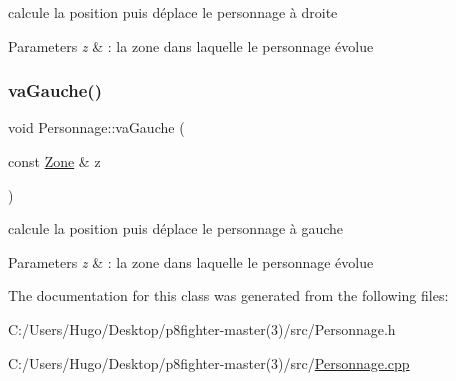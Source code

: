 calcule la position puis déplace le personnage à droite 


\begin{DoxyParams}{Parameters}
{\em z} & \+: la zone dans laquelle le personnage évolue \\
\hline
\end{DoxyParams}
\mbox{\label{class_personnage_a35571e5e906d9e04f901ac73c6bd9869}} 
\subsubsection{\texorpdfstring{va\+Gauche()}{vaGauche()}}
{\footnotesize\ttfamily void Personnage\+::va\+Gauche (\begin{DoxyParamCaption}\item[{const \hyperlink{class_zone}{Zone} \&}]{z }\end{DoxyParamCaption})}



calcule la position puis déplace le personnage à gauche 


\begin{DoxyParams}{Parameters}
{\em z} & \+: la zone dans laquelle le personnage évolue \\
\hline
\end{DoxyParams}


The documentation for this class was generated from the following files\+:\begin{DoxyCompactItemize}
\item 
C\+:/\+Users/\+Hugo/\+Desktop/p8fighter-\/master(3)/src/Personnage.\+h\item 
C\+:/\+Users/\+Hugo/\+Desktop/p8fighter-\/master(3)/src/\hyperlink{_personnage_8cpp}{Personnage.\+cpp}\end{DoxyCompactItemize}
